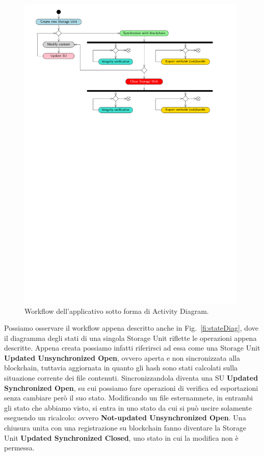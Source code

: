 \begin{figure}[H]
    \centering
    \includegraphics[width=0.98\textwidth]{Figures/activityDiag}
    \caption{\small{
    Workflow dell’applicativo sotto forma di Activity Diagram.
    } %
    } %
    \label{fi:workflow}
\end{figure}

\newpage

Possiamo osservare il workflow appena descritto anche in Fig.~\ref{fi:stateDiag}, dove il diagramma degli
stati di una singola Storage Unit riflette le operazioni appena descritte.
Appena creata possiamo infatti riferirsci ad essa come una Storage Unit \textbf{Updated Unsynchronized Open},
ovvero aperta e non sincronizzata alla blockchain, tuttavia aggiornata in quanto gli hash sono stati calcolati
sulla situazione corrente dei file contenuti. Sincronizzandola diventa una SU \textbf{Updated Synchronized Open},
su cui possiamo fare operazioni di verifica ed esportazioni senza cambiare però il suo stato.
Modificando un file esternamnete, in entrambi gli stato che abbiamo visto, si entra in uno stato da cui si
può uscire solamente eseguendo un ricalcolo: ovvero \textbf{Not-updated Unsynchronized Open}.
Una chiusura unita con una registrazione su blockchain fanno diventare la Storage Unit
\textbf{Updated Synchronized Closed}, uno stato in cui la modifica non è permessa.


